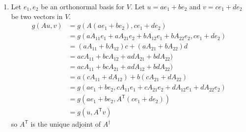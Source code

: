 \documentclass[a4paper, 12pt]{article}
\newcommand{\tr}{^{\mathsf{T}}}
\begin{document}
\begin{enumerate}
\begin{enumerate}
\item Let \(e_1,e_2\) be an orthonormal basis for \(V\). Let \(u=ae_1+be_2\) and \(v=ce_1+de_2\) be two vectors in \(V\).
\begin{align*}
g(Au,v)&=g(A(ae_1+be_2),ce_1+de_2)\\
&=g(aA_{11}e_1+aA_{21}e_2+bA_{12}e_1+bA_{22}e_2,ce_1+de_2)\\
&=(aA_{11}+bA_{12})c+(aA_{21}+bA_{22})d\\
&=acA_{11}+bcA_{12}+adA_{21}+bdA_{22})\\
&=acA_{11}+bcA_{21}+adA_{12}+bdA_{22})\\
&=a(cA_{11}+dA_{12})+b(cA_{21}+dA_{22})\\
&=g(ae_1+be_2,cA_{11}e_1+cA_{21}e_2+dA_{12}e_1+dA_{22}e_2)\\
&=g(ae_1+be_2,A\tr(ce_1+de_2))\\
&=g(u,A\tr v)
\end{align*}
so \(A\tr\) is the unique adjoint of \(A^\dag\)

\end{enumerate}

\end{enumerate}
\end{document}
